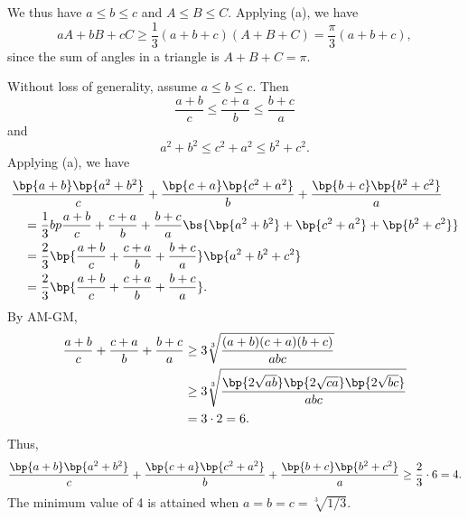 \begin{solution}
\begin{ppart}
        We thus have $a \leq b \leq c$ and $A \leq B \leq C$. Applying (a), we have \[aA + bB + cC \geq \frac13 (a + b + c) (A + B + C) = \frac\pi3 (a + b + c),\] since the sum of angles in a triangle is $A + B + C = \pi$.
    \end{ppart}
    \begin{ppart}
        Without loss of generality, assume $a \leq b \leq c$. Then \[\frac{a + b}{c} \leq \frac{c + a}{b} \leq \frac{b + c}{a}\] and \[a^2 + b^2 \leq c^2 + a^2 \leq b^2 + c^2.\] Applying (a), we have 
        \begin{align*}
            &\frac{\bp{a + b}\bp{a^2 + b^2}}{c} + \frac{\bp{c+a}\bp{c^2 + a^2}}{b} + \frac{\bp{b+c}\bp{b^2 + c^2}}{a} \\
            &\hspace{1em}= \frac13 bp{\frac{a + b}{c} + \frac{c + a}{b} + \frac{b + c}{a}}\bs{\bp{a^2 + b^2} + \bp{c^2 + a^2} + \bp{b^2 + c^2}}\\
            &\hspace{1em}= \frac23 \bp{\frac{a + b}{c} + \frac{c + a}{b} + \frac{b + c}{a}} \bp{a^2 + b^2 + c^2}\\
            &\hspace{1em}= \frac23 \bp{\frac{a + b}{c} + \frac{c + a}{b} + \frac{b + c}{a}}.
        \end{align*}
        By AM-GM,
        \begin{align*}
            \frac{a + b}{c} + \frac{c + a}{b} + \frac{b + c}{a} &\geq 3 \sqrt[3]{\frac{(a+b)(c+a)(b+c)}{abc}}\\
            &\geq 3 \sqrt[3]{\frac{\bp{2\sqrt{ab}} \bp{2\sqrt{ca}} \bp{2\sqrt{bc}}}{abc}}\\
            &= 3 \cdot 2 = 6.
        \end{align*}
        Thus, \[\frac{\bp{a + b}\bp{a^2 + b^2}}{c} + \frac{\bp{c+a}\bp{c^2 + a^2}}{b} + \frac{\bp{b+c}\bp{b^2 + c^2}}{a} \geq \frac23 \cdot 6 = 4.\] The minimum value of 4 is attained when $a = b = c = \sqrt[3]{1/3}$.
    \end{ppart}
\end{solution}

